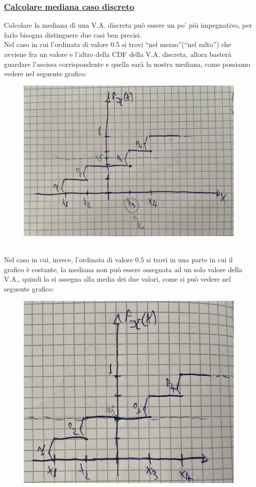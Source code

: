 \documentclass{article}
\begin{document}
\subsubsection{\underline{Calcolare mediana caso discreto}}
Calcolare la mediana di una V.A. discreta può essere un po' più impegnativo, per farlo bisogna distinguere due casi ben precisi. \\
Nel caso in cui l’ordinata di valore $0.5$ si trovi “nel mezzo”(“nel salto”) che avviene fra un valore e l’altro della CDF della V.A. discreta, allora basterà guardare l’ascissa corrispondente e quella sarà la nostra mediana, come possiamo vedere nel seguente grafico:
\begin{figure}[ht]
\centering
\includegraphics[scale=0.10]{images/55.MedianaDisc1.jpeg}
\end{figure} ~\\
Nel caso in cui, invece, l’ordinata di valore $0.5$ si trovi in una parte in cui il grafico è costante, la mediana non può essere assegnata ad un solo valore della V.A., quindi la si assegna alla media dei due valori, come si può vedere nel seguente grafico:
\begin{figure}[ht]
\centering
\includegraphics[scale=0.10]{images/56.MedianaDisc2.jpeg}
\end{figure} ~\\
\end{document}
